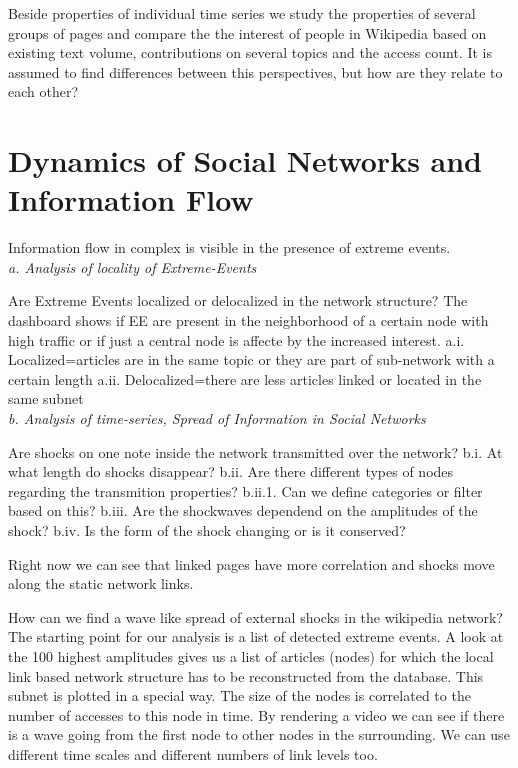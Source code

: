 \documentclass[a4paper,10pt]{scrbook}
\begin{document}
Beside properties of individual time series we study the properties of several groups of pages and compare the the 
interest of people in Wikipedia based on existing text volume, contributions on several topics and the access count.
It is assumed to find differences between this perspectives, but how are they relate to each other?


\section*{Dynamics of Social Networks and Information Flow}

Information flow in complex is visible in the presence of extreme events.\\

\textit{a. Analysis of locality of Extreme-Events}
 
Are Extreme Events localized or delocalized in the network structure? 
The dashboard shows if EE are present in the neighborhood of a certain node with high traffic or if just a central
node is affecte by the increased interest.
a.i. Localized=articles are in the same topic or they are part of sub-network with a certain length 
a.ii. Delocalized=there are less articles linked or located in the same subnet\\

\textit{b. Analysis of time-series, Spread of Information in Social Networks}

Are shocks on one note inside the network transmitted over the network?
b.i. At what length do shocks disappear?
b.ii. Are there different types of nodes regarding the transmition properties?
b.ii.1. Can we define categories or filter based on this?
b.iii. Are the shockwaves dependend on the amplitudes of the shock?
b.iv. Is the form of the shock changing or is it conserved?

Right now we can see that linked pages have more correlation and shocks move along the static network links.

How can we find a wave like spread of external shocks in the wikipedia network?
The starting point for our analysis is a list of detected extreme events. A look 
at the 100 highest amplitudes gives us a list of articles (nodes) for which the 
local link based network structure has to be reconstructed from the database. 
This subnet is plotted in a special way. The size of the nodes is correlated 
to the number of accesses to this node in time. By rendering a video we can 
see if there is a wave going from the first node to other nodes in the surrounding. 
We can use different time scales and different numbers of link levels too.
\end{document}
